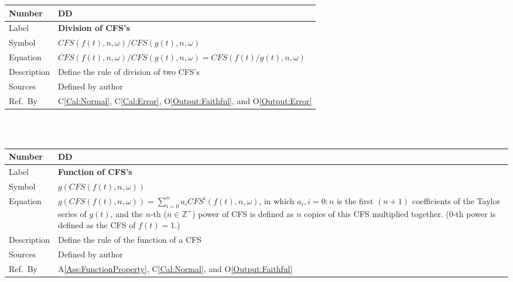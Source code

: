 \documentclass[12pt]{article}
\newcommand{\colAwidth}{0.13\textwidth}
\newcommand{\colBwidth}{0.82\textwidth}
\newcounter{defnum} %
\newcounter{datadefnum} %
\newcommand{\aref}[1]{A\ref{#1}}
\newcommand{\calref}[1]{C\ref{#1}}
\newcommand{\oref}[1]{O\ref{#1}}
\begin{document}
\noindent
\begin{minipage}{\textwidth}
	\renewcommand*{\arraystretch}{1.5}
	\begin{tabular}{| p{\colAwidth} | p{\colBwidth}|}
		\hline
		\rowcolor[gray]{0.9}
		Number& DD{datadefnum}\thedatadefnum \label{DD:Division}\\
		\hline
		Label& \bf Division of CFS's\\
		\hline
		Symbol &$\mathit{CFS}(f(t), n, \omega)/\mathit{CFS}(g(t), n, \omega)$\\
		\hline
		Equation& $\mathit{CFS}(f(t), n, \omega)/\mathit{CFS}(g(t), n, \omega)=\mathit{CFS}(f(t)/g(t), n, \omega)$ \\
		\hline
		Description & Define the rule of division of two CFS's\\
		\hline
		Sources& Defined by author\\
		\hline
		Ref.\ By & \calref{Cal:Normal}, \calref{Cal:Error},  \oref{Output:Faithful}, and \oref{Output:Error}\\
		\hline
	\end{tabular}
\end{minipage}\\
~\newline

\noindent
\begin{minipage}{\textwidth}
	\renewcommand*{\arraystretch}{1.5}
	\begin{tabular}{| p{\colAwidth} | p{\colBwidth}|}
		\hline
		\rowcolor[gray]{0.9}
		Number& DD{datadefnum}\thedatadefnum \label{DD:Function}\\
		\hline
		Label& \bf Function of CFS's\\
		\hline
		Symbol &$g(\mathit{CFS}(f(t), n, \omega))$\\
		\hline
		Equation& $g(\mathit{CFS}(f(t), n, \omega))=\sum_{i=0}^{n}a_i \mathit{CFS}^i(f(t), n, \omega)$, in which $a_i, i=0:n$ is the first $(n+1)$ coefficients of the Taylor series of $g(t)$, and the $n$-th ($n\in\mathbb{Z}^{+}$) power of CFS is defined as $n$ copies of this CFS multiplied together. ($0$-th power is defined as the CFS of $f(t)=1$.)\\
		\hline
		Description & Define the rule of the function of a CFS\\
		\hline
		Sources& Defined by author\\
		\hline
		Ref.\ By & \aref{Ass:FunctionProperty},  \calref{Cal:Normal}, and  \oref{Output:Faithful}\\
		\hline
	\end{tabular}
\end{minipage}\\
~\newline
\end{document}
